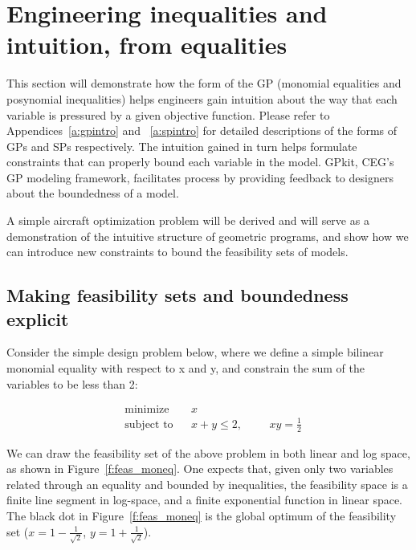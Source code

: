 \chapter{Engineering inequalities and intuition, from equalities}
\label{ch2:inequalities}

This section will demonstrate how the form of the \gls{GP} (monomial
equalities and posynomial inequalities) helps engineers gain intuition
about the way that each variable is pressured
by a given objective function. Please refer to Appendices~\ref{a:gpintro} and ~\ref{a:spintro}
for detailed descriptions of the forms of \gls{GP}s and \gls{SP}s respectively.
The intuition gained in turn helps formulate
constraints that can properly bound each variable in the model.
GPkit, \gls{CEG}'s \gls{GP} modeling framework,
facilitates process by providing feedback to designers about
the boundedness of a model.

A simple aircraft optimization problem will be derived and will serve as
a demonstration of the intuitive structure of geometric programs, and show
how we can introduce new constraints to bound the feasibility sets of models.

\section{Making feasibility sets and boundedness explicit}

Consider the simple design problem below, where we define a simple bilinear
monomial equality with respect to x and y, and constrain the sum of the variables
to be less than 2:

\begin{equation*}
\begin{aligned}
& {\text{minimize}}
& & x \\
& \text{subject to}
& & x + y \leq 2,
    & & & xy = \frac{1}{2} \label{simple_moneq}
\end{aligned}
\end{equation*}

We can draw the feasibility set of the above problem in both linear and log space,
as shown in Figure~\ref{f:feas_moneq}. One expects that, given only two variables
related through an equality and bounded by inequalities, the feasibility space is
a finite line segment in log-space, and a finite exponential function in linear space.
The black dot in Figure~\ref{f:feas_moneq} is the global optimum of the feasibility set
($x = 1 - \frac{1}{\sqrt{2}}$, $y = 1 + \frac{1}{\sqrt{2}}$).


